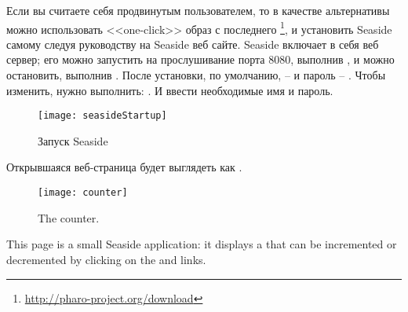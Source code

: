 \documentclass[a4paper,10pt,twoside]{book}
\begin{document}
Если вы считаете себя продвинутым пользователем,
то в качестве альтернативы можно использовать <<one-click>> образ
с последнего \footnote{\url{http://pharo-project.org/download}},
и установить Seaside самому следуя руководству
 на Seaside веб сайте.
Seaside включает в себя веб сервер; его можно запустить на прослушивание порта 8080,
выполнив  ,
и можно остановить, выполнив .
После установки, по умолчанию,
 --  и пароль -- .
Чтобы изменить, нужно выполнить:  .
И ввести необходимые имя и пароль.


\begin{figure}[tbh]
\begin{center}
\texttt{[image: seasideStartup]}

\caption{Запуск Seaside}

\end{center}
\end{figure}


\noindent
Открывшаяся веб-страница будет выглядеть как .

\noindent
{}

\begin{figure}[htb]
\begin{center}
\texttt{[image: counter]}
\caption{The counter.}
\end{center}
\end{figure}

\noindent
This page is a small Seaside application: it displays a  that
can be incremented or decremented by clicking on the \link{++} and \link{--\,--} links.

\noindent
{}
\end{document}

